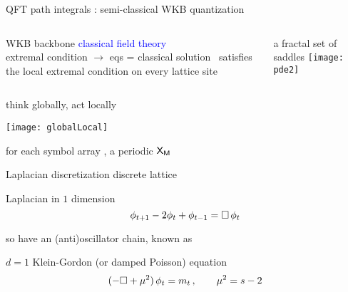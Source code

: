 \begin{frame}{QFT path integrals : semi-classical WKB quantization}
  \begin{columns}
\begin{block}{WKB backbone}
\textcolor{blue}{classical field theory}
\\
extremal condition $\to$ eqs
\beq
{}=
classical solution \Xx\ satisfies
the local extremal condition on every lattice site
\end{block}
\begin{block}{a fractal set of saddles}
\texttt{[image: pde2]}%
\end{block}
  \end{columns}
\end{frame}

\begin{frame}{think globally, act locally}
    \begin{center}
\texttt{[image: globalLocal]}
    \end{center}
for each symbol array \Mm, a periodic {\lattstate} $\Xx_\Mm$
\end{frame} %

\begin{frame}{Laplacian discretization}
discrete lattice
\begin{block}{Laplacian in $1$ dimension}
\[
\ssp_{\zeit+1} - 2\ssp_{\zeit} + \ssp_{\zeit-1}
     =
\Box\,\ssp_{\zeit}
\]
\end{block}
\medskip

so have an (anti)oscillator chain, known as
\begin{block}{$d=1$ Klein-Gordon (or damped Poisson) equation}
\[
 (-\Box + {\mu}^2)\,\phi_{t} = m_t
\,, \qquad
{\mu}^2= s-2
\] %
\end{block}
\end{frame} %

